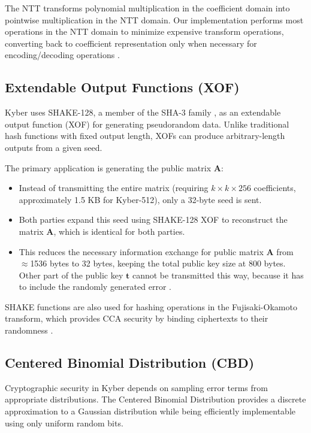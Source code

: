 The NTT transforms polynomial multiplication in the coefficient domain into pointwise multiplication in the NTT domain. Our implementation performs most operations in the NTT domain to minimize expensive transform operations, converting back to coefficient representation only when necessary for encoding/decoding operations \cite{Kyber-Spec}.

\subsection{Extendable Output Functions (XOF)}

Kyber uses SHAKE-128, a member of the SHA-3 family \cite{FIPS202}, as an extendable output function (XOF) for generating pseudorandom data. Unlike traditional hash functions with fixed output length, XOFs can produce arbitrary-length outputs from a given seed.

The primary application is generating the public matrix $\mathbf{A}$:
\begin{itemize}
    \item Instead of transmitting the entire matrix (requiring $k \times k \times 256$ coefficients, approximately 1.5 KB for Kyber-512), only a 32-byte seed is sent.
    \item Both parties expand this seed using SHAKE-128 XOF to reconstruct the matrix $\mathbf{A}$, which is identical for both parties.
    \item This reduces the necessary information exchange for public matrix $\mathbf{A}$ from $\approx$1536 bytes to 32 bytes, keeping the total public key size at 800 bytes. Other part of the public key $\mathbf{t}$ cannot be transmitted this way, because it has to include the randomly generated error \cite{Kyber-Spec}.
\end{itemize}

SHAKE functions are also used for hashing operations in the Fujisaki-Okamoto transform, which provides CCA security by binding ciphertexts to their randomness \cite{Kyber-Spec}.

\subsection{Centered Binomial Distribution (CBD)}

Cryptographic security in Kyber depends on sampling error terms from appropriate distributions. The Centered Binomial Distribution provides a discrete approximation to a Gaussian distribution while being efficiently implementable using only uniform random bits.

